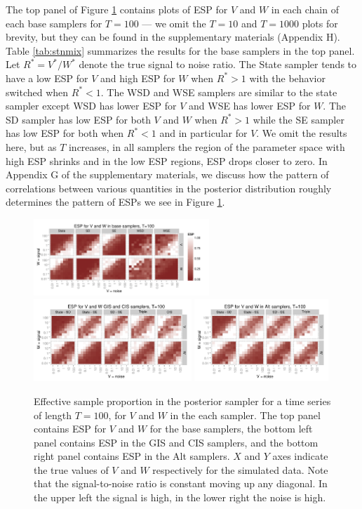 \documentclass[12pt]{article}
\begin{document}
The top panel of Figure \ref{ESplot} contains plots of ESP for $V$ and $W$ in each chain of each base samplers for $T=100$ --- we omit the $T=10$ and $T=1000$ plots for brevity, but they can be found in the supplementary materials (Appendix H). Table \ref{tab:stnmix} summarizes the results for the base samplers in the top panel. Let $R^*=V^*/W^*$ denote the true signal to noise ratio. The State sampler tends to have a low ESP for $V$ and high ESP for $W$ when $R^*>1$ with the behavior switched when $R^*<1$. The WSD and WSE samplers are similar to the state sampler except WSD has lower ESP for $V$ and WSE has lower ESP for $W$. The SD sampler has low ESP for both $V$ and $W$ when $R^*>1$ while the SE sampler has low ESP for both when $R^*<1$ and in particular for $V$. We omit the results here, but as $T$ increases, in all samplers the region of the parameter space with high ESP shrinks and in the low ESP regions, ESP drops closer to zero. In Appendix G of the supplementary materials, we discuss how the pattern of correlations between various quantities in the posterior distribution roughly determines the pattern of ESPs we see in Figure \ref{ESplot}. 

\begin{figure}[!h]
\centering
\includegraphics[width=0.59\textwidth]{basecisESplot100}
\includegraphics[width=0.53\textwidth]{altintESplotV100}
\includegraphics[width=0.45\textwidth]{altintESplotW100}
\caption{Effective sample proportion in the posterior sampler for a time series of length $T=100$, for $V$ and $W$ in the each sampler. The top panel contains ESP for $V$ and $W$ for the base samplers, the bottom left panel contains ESP in the GIS and CIS samplers, and the bottom right panel contains ESP in the Alt samplers. $X$ and $Y$ axes indicate the true values of $V$ and $W$ respectively for the simulated data. Note that the signal-to-noise ratio is constant moving up any diagonal. In the upper left the signal is high, in the lower right the noise is high.}
\label{ESplot}
\end{figure}
\end{document}
